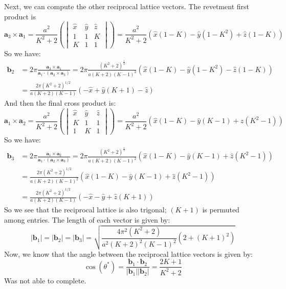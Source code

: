 \documentclass[12pt]{article}
\begin{document}
Next, we can compute the other reciprocal lattice vectors. The revetment first product is
\begin{equation}
    \mathbf{a}_3 \times \mathbf{a}_1 = \frac{a^2}{K^2 + 2} \left(\begin{vmatrix} \hat{x} & \hat{y} & \hat{z} \\ 1 & 1 & K \\ K & 1 & 1 \end{vmatrix}\right) = \frac{a^2}{K^2 + 2} \left(\hat{x}(1 - K) - \hat{y}(1-K^2) + \hat{z}(1-K)\right)
\end{equation}
So we have:
\begin{align}
    \mathbf{b}_2 &= 2\pi \frac{\mathbf{a}_3 \times \mathbf{a}_1}{\mathbf{a}_1 \cdot (\mathbf{a}_2 \times \mathbf{a}_3)} = 2\pi{\frac{(K^2 +2)^{\frac{1}{2}}}{a (K+2)(K-1)^2}} \left(\hat{x}(1 - K) - \hat{y}(1-K^2) - \hat{z}(1-K)\right) \\
    &= \frac{2\pi(K^2 +2)^{1/2}}{a (K+2)(K-1)} \left(-\hat{x} + \hat{y}(K+1) - \hat{z}\right)
\end{align}
And then the final cross product is:
\begin{equation}
    \mathbf{a}_1 \times \mathbf{a}_2 = \frac{a^2}{K^2 + 2} \left(\begin{vmatrix} \hat{x} & \hat{y} & \hat{z} \\ K & 1 & 1 \\ 1 & K & 1 \end{vmatrix}\right) = \frac{a^2}{K^2 + 2} \left(\hat{x}(1-K) - \hat{y}(K-1) + \hat{z}(K^2 - 1)\right)
\end{equation}
So we have:
\begin{align}
    \mathbf{b}_3 &= 2\pi \frac{\mathbf{a}_1 \times \mathbf{a}_2}{\mathbf{a}_1 \cdot (\mathbf{a}_2 \times \mathbf{a}_3)} = 2\pi{\frac{(K^2 +2)^{\frac{1}{2}}}{a (K+2)(K-1)^2}} \left(\hat{x}(1-K) - \hat{y}(K-1) + \hat{z}(K^2 - 1)\right) \\
    &= \frac{2\pi(K^2 +2)^{1/2}}{a (K+2)(K-1)^2} \left(\hat{x}(1-K) - \hat{y}(K-1) + \hat{z}(K^2 - 1)\right) \\
    &= \frac{2\pi(K^2 +2)^{1/2}}{a (K+2)(K-1)} \left(-\hat{x} - \hat{y} + \hat{z}(K+1)\right)
\end{align}
So we see that the reciprocal lattice is also trigonal; $(K+1)$ is permuted among entries. The length of each vector is given by:
\begin{equation}
    |\mathbf{b}_1| = |\mathbf{b}_2| = |\mathbf{b}_3| = \sqrt{\frac{4\pi^2(K^2 + 2)}{a^2(K+2)^2(K-1)^2} \left( 2 + (K+1)^2 \right)}
\end{equation}
Now, we know that the angle between the reciprocal lattice vectors is given by:
\begin{equation}
    \cos(\theta^*) = \frac{\mathbf{b}_1 \cdot \mathbf{b}_2}{|\mathbf{b}_1||\mathbf{b}_2|} = \frac{2K+1}{K^2 + 2}
\end{equation}
Was not able to complete.
\end{document}
